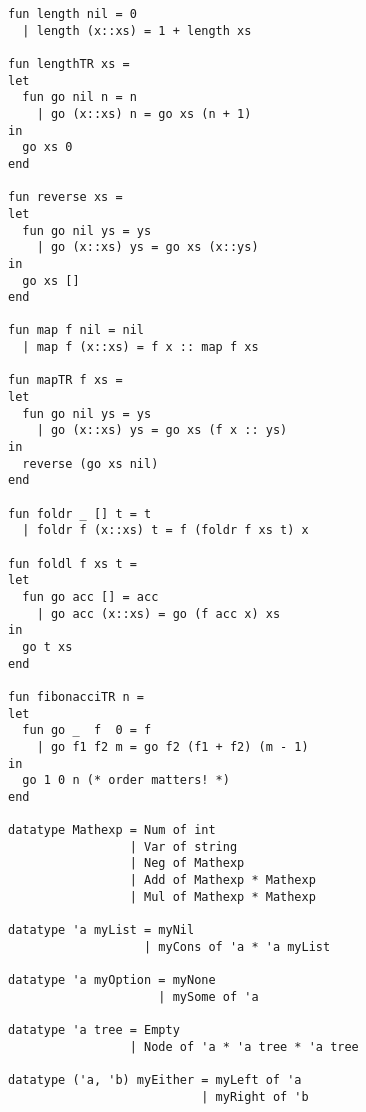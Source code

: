 \documentclass[twocolumn]{article}
\begin{document}
\begin{verbatim}
fun length nil = 0
  | length (x::xs) = 1 + length xs

fun lengthTR xs =
let
  fun go nil n = n
    | go (x::xs) n = go xs (n + 1)
in
  go xs 0
end

fun reverse xs =
let
  fun go nil ys = ys
    | go (x::xs) ys = go xs (x::ys)
in
  go xs []
end

fun map f nil = nil
  | map f (x::xs) = f x :: map f xs

fun mapTR f xs =
let
  fun go nil ys = ys
    | go (x::xs) ys = go xs (f x :: ys)
in
  reverse (go xs nil)
end

fun foldr _ [] t = t
  | foldr f (x::xs) t = f (foldr f xs t) x

fun foldl f xs t =
let
  fun go acc [] = acc
    | go acc (x::xs) = go (f acc x) xs
in
  go t xs
end

fun fibonacciTR n =
let
  fun go _  f  0 = f
    | go f1 f2 m = go f2 (f1 + f2) (m - 1)
in
  go 1 0 n (* order matters! *)
end

datatype Mathexp = Num of int
                 | Var of string
                 | Neg of Mathexp
                 | Add of Mathexp * Mathexp
                 | Mul of Mathexp * Mathexp

datatype 'a myList = myNil
                   | myCons of 'a * 'a myList

datatype 'a myOption = myNone
                     | mySome of 'a

datatype 'a tree = Empty
                 | Node of 'a * 'a tree * 'a tree

datatype ('a, 'b) myEither = myLeft of 'a
                           | myRight of 'b

\end{verbatim}
\end{document}
